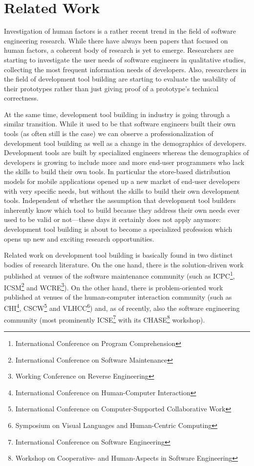 \chapter{Related Work}
\label{the chapter on related work}

Investigation of human factors is a rather recent trend in the field of software engineering research. While there have always been papers that focused on human factors, a coherent body of research is yet to emerge. 
Researchers are starting to investigate the user needs of software engineers in qualitative studies, collecting \eg the most frequent information needs of developers. Also, researchers in the field of development tool building are starting to evaluate the usability of their prototypes rather than just giving proof of a prototype's technical correctness. 

At the same time, development tool building in industry is going through a similar transition. While it used to be that software engineers built their own tools (as often still is the case) we can observe a professionalization of development tool building as well as a change in the demographics of developers. Development tools are built by specialized engineers whereas the demographics of developers is growing to include more and more end-user programmers who lack the skills to build their own tools. In particular the store-based distribution models for mobile applications opened up a new market of end-user developers with very specific needs, but without the skills to build their own development tools. Independent of whether the assumption that development tool builders inherently know which tool to build because they address their own needs ever used to be valid or not---these days it certainly does not apply anymore: development tool building is about to become a specialized profession which opens up new and exciting research opportunities.

Related work on development tool building is basically found in two distinct bodies of research literature. On the one hand, there is the solution-driven work published at venues of the software maintenance community (such as ICPC\footnote{International Conference on Program Comprehension}, ICSM\footnote{International Conference on Software Maintenance} and WCRE\footnote{Working Conference on Reverse Engineering}). On the other hand, there is problem-oriented work published at venues of the human-computer interaction community (such as CHI\footnote{International Conference on Human-Computer Interaction}, CSCW\footnote{International Conference on Computer-Supported Collaborative Work} and VLHCC\footnote{Symposium on Visual Languages and Human-Centric Computing}) and, as of recently, also the software engineering community (most prominently ICSE\footnote{International Conference on Software Engineering} with its CHASE\footnote{Workshop on Cooperative- and Human-Aspects in Software Engineering} workshop). 

